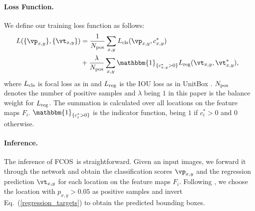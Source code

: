 \documentclass[10pt,twocolumn,letterpaper]{article}
\newcommand{\1}{{\mathbbm{1}}}           %
\def\Ours{{FCNDet}\xspace}
\def\Ours{{FCOS}\xspace}
\begin{document}
%
%
\def\cls{ {\rm cls} }
\def\reg{ {\rm reg} }
\def\pos{ {\rm pos} }


\paragraph{Loss Function.} We define our training loss function as follows:
%
\begin{align} 
\label{loss_function}
    L(\{\vp_{x, y}\}, \{\vt_{x, y}\}) &= \frac{1}{N_{\pos}} \sum_{x, y}{L_{\cls}(\vp_{x, y}, c^*_{x, y})} \nonumber \\
    & + \frac{\lambda}{N_{\pos}}\sum_{{x, y}}{\mathbbm{1}_{\{c^*_{x, y} > 0\}}L_{\reg}(\vt_{x, y}, \vt^*_{x, y})},
\end{align}
%
where $L_{\cls}$ is focal loss as in \cite{lin2017focal} and $L_{\reg}$ is the IOU loss as in UnitBox \cite{yu2016unitbox}.  $N_{\pos}$ denotes the number of positive samples and $\lambda$ being $1$ in this paper is the balance weight for $L_{\reg}$. The summation is calculated  over all locations on the feature maps $F_i$. $\mathbbm{1}_{\{c^*_i > 0\}}$ is the indicator function, being $1$ if $c^*_i > 0$ and $0$ otherwise.



\paragraph{Inference.} The inference of \Ours\ is straightforward. Given an input images, we forward it through the network and obtain the classification 
scores 
%
$\vp_{x, y}$ 
%
and the regression prediction $\vt_{x, y}$ for each location on the feature maps $F_i$. Following \cite{lin2017focal}, we choose the location with $p_{x, y} > 0.05$ as positive samples and invert Eq.~(\ref{regression_targets}) to obtain the predicted bounding boxes.
\end{document}
